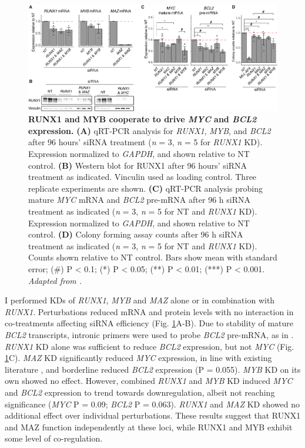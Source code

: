 \begin{figure}[!t]
    \centering
    \includegraphics[width=\textwidth,height=\textheight,keepaspectratio]{figures/chapter4/ch4_tf-coop-kd.png}
    \caption[{RUNX1 and MYB cooperate to drive \textit{MYC} and \textit{BCL2} expression.}]
    {\textbf{RUNX1 and MYB cooperate to drive \textit{MYC} and \textit{BCL2} expression.} 
    \textbf{(A)} qRT-PCR analysis for \textit{RUNX1}, \textit{MYB}, and \textit{BCL2} after 96 hours’ siRNA treatment (\textit{n} = 3, \textit{n} = 5 for \textit{RUNX1} KD). Expression normalized to \textit{GAPDH}, and shown relative to NT control. 
    \textbf{(B)} Western blot for RUNX1 after 96 hours’ siRNA treatment as indicated. Vinculin used as loading control. Three replicate experiments are shown. 
    \textbf{(C)} qRT-PCR analysis probing mature \textit{MYC} mRNA and \textit{BCL2} pre-mRNA after 96 h siRNA treatment as indicated (\textit{n} = 3, \textit{n} = 5 for NT and \textit{RUNX1} KD). Expression normalized to \textit{GAPDH}, and shown relative to NT control. 
    \textbf{(D)} Colony forming assay counts after 96 h siRNA treatment as indicated (\textit{n} = 3, \textit{n} = 5 for NT and \textit{RUNX1} KD). Counts shown relative to NT control. 
    Bars show mean with standard error; (\#) P < 0.1; (*) P < 0.05; (**) P < 0.01; (***) P < 0.001.
    \textit{Adapted from \cite{harman_kmt2a-aff1_2021}.}
    }
    \label{fig:ch4_tf-coop-kd}
\end{figure}

I performed KDs of \textit{RUNX1}, \textit{MYB} and \textit{MAZ} alone or in combination with \textit{RUNX1}. Perturbations reduced mRNA and protein levels with no interaction in co-treatments affecting siRNA efficiency (Fig. \ref{fig:ch4_tf-coop-kd}A-B). Due to stability of mature \textit{BCL2} transcripts, intronic primers were used to probe \textit{BCL2} pre-mRNA, as in \cite{crump_bet_2021}. \textit{RUNX1} KD alone was sufficient to reduce \textit{BCL2} expression, but not \textit{MYC} (Fig. \ref{fig:ch4_tf-coop-kd}C). \textit{MAZ} KD significantly reduced \textit{MYC} expression, in line with existing literature \citep{komatsu_maz_1997}, and borderline reduced \textit{BCL2} expression (P = 0.055). \textit{MYB} KD on its own showed no effect. However, combined \textit{RUNX1} and \textit{MYB} KD induced \textit{MYC} and \textit{BCL2} expression to trend towards downregulation, albeit not reaching significance (\textit{MYC} P = 0.09; \textit{BCL2} P = 0.063). \textit{RUNX1} and \textit{MAZ} KD showed no additional effect over individual perturbations. These results suggest that RUNX1 and MAZ function independently at these loci, while RUNX1 and MYB exhibit some level of co-regulation. 

